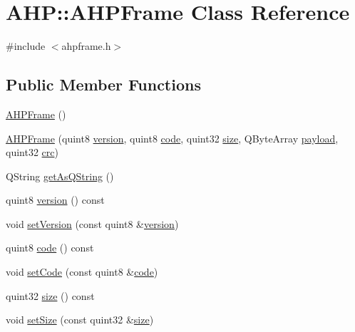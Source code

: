 \hypertarget{class_a_h_p_1_1_a_h_p_frame}{}\section{A\+H\+P\+:\+:A\+H\+P\+Frame Class Reference}
\label{class_a_h_p_1_1_a_h_p_frame}


{\ttfamily \#include $<$ahpframe.\+h$>$}

\subsection*{Public Member Functions}
\begin{DoxyCompactItemize}
\item 
\hyperlink{class_a_h_p_1_1_a_h_p_frame_ad6d150337665ca32e6eb66d07cda0e8f}{A\+H\+P\+Frame} ()
\item 
\hyperlink{class_a_h_p_1_1_a_h_p_frame_ae470029f37eadc15023f5d03847a6536}{A\+H\+P\+Frame} (quint8 \hyperlink{class_a_h_p_1_1_a_h_p_frame_aa8d8deafed708350426f6e1fbb5d2625}{version}, quint8 \hyperlink{class_a_h_p_1_1_a_h_p_frame_ae4fa0e02eeb91cb892757ab4697e44bc}{code}, quint32 \hyperlink{class_a_h_p_1_1_a_h_p_frame_ac67f53aa6aeb91a7feadd08769dff85b}{size}, Q\+Byte\+Array \hyperlink{class_a_h_p_1_1_a_h_p_frame_a882b4bee25dbbe335cd39938c2305946}{payload}, quint32 \hyperlink{class_a_h_p_1_1_a_h_p_frame_ad15ef1d88d0069d51267a3f5347e3b13}{crc})
\item 
Q\+String \hyperlink{class_a_h_p_1_1_a_h_p_frame_ab5afd917bfc9d58236ec3b3e406a53ae}{get\+As\+Q\+String} ()
\item 
quint8 \hyperlink{class_a_h_p_1_1_a_h_p_frame_aa8d8deafed708350426f6e1fbb5d2625}{version} () const 
\item 
void \hyperlink{class_a_h_p_1_1_a_h_p_frame_ae8db56b93e4d8653bf5eb74dbbc5fd2f}{set\+Version} (const quint8 \&\hyperlink{class_a_h_p_1_1_a_h_p_frame_aa8d8deafed708350426f6e1fbb5d2625}{version})
\item 
quint8 \hyperlink{class_a_h_p_1_1_a_h_p_frame_ae4fa0e02eeb91cb892757ab4697e44bc}{code} () const 
\item 
void \hyperlink{class_a_h_p_1_1_a_h_p_frame_a4389021b33615e70673ca481785dc5e3}{set\+Code} (const quint8 \&\hyperlink{class_a_h_p_1_1_a_h_p_frame_ae4fa0e02eeb91cb892757ab4697e44bc}{code})
\item 
quint32 \hyperlink{class_a_h_p_1_1_a_h_p_frame_ac67f53aa6aeb91a7feadd08769dff85b}{size} () const 
\item 
void \hyperlink{class_a_h_p_1_1_a_h_p_frame_a590d8fcdb60c5dc4e5808cab492f58b7}{set\+Size} (const quint32 \&\hyperlink{class_a_h_p_1_1_a_h_p_frame_ac67f53aa6aeb91a7feadd08769dff85b}{size})

\end{DoxyCompactItemize}
